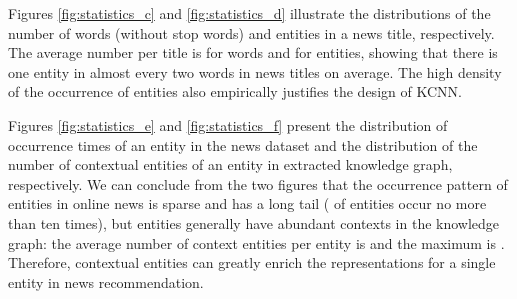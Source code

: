 \documentclass[sigconf]{acmart}
\begin{document}
		Figures \ref{fig:statistics_c} and \ref{fig:statistics_d} illustrate the distributions of the number of words (without stop words) and entities in a news title, respectively.
		The average number per title is  for words and  for entities, showing that there is one entity in almost every two words in news titles on average.
		The high density of the occurrence of entities also empirically justifies the design of KCNN.
		
		Figures \ref{fig:statistics_e} and \ref{fig:statistics_f} present the distribution of occurrence times of an entity in the news dataset and the distribution of the number of contextual entities of an entity in extracted knowledge graph, respectively.
		We can conclude from the two figures that the occurrence pattern of entities in online news is sparse and has a long tail ( of entities occur no more than ten times), but entities generally have abundant contexts in the knowledge graph: the average number of context entities per entity is  and the maximum is .
		Therefore, contextual entities can greatly enrich the representations for a single entity in news recommendation.
		
\end{document}
